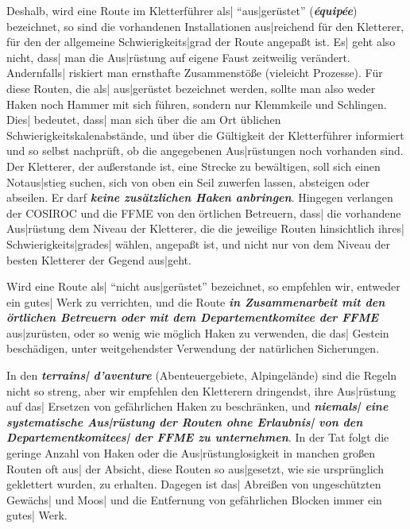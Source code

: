 \documentclass[12pt]{article}
\def\Ital#1{{\bfseries\slshape #1\/}}
\def\3{\ss}
\def\<{``}
\def\>{''}
\def\FFME{{\SetCmDefault\rm FFME{}}}
\def\COSIROC{{\SetCmDefault\rm COSIROC{}}}
\begin{document}
 Deshalb, wird eine Route im Kletterf\"uhrer als| \<aus|ger\"ustet\>
(\Ital{\'equip\'ee}) be\-zeich\-net, so sind die vorhandenen Installationen
aus|reichend f\"ur den Kletterer, f\"ur den der allgemeine Schwierigkeits|grad
der Route angepa\3t ist. Es| geht also nicht, das{}s| man die Aus|r\"ustung
auf eigene Faust zeitweilig ver\"andert. Andernfalls| riskiert man ernsthafte
Zusammenst\"o\3e (vieleicht Prozesse). F\"ur diese Routen, die
als| aus|ger\"ustet be\-zeich\-net werden, sollte man also weder Haken noch
Hammer mit sich f\"uhren, sondern nur Klemmkeile und Schlingen. Dies|
bedeutet, das{}s| man sich \"uber die am Ort \"ublichen
Schwierigkeit\-skalenabst\"ande, und \"uber die G\"ultigkeit der
Kletterf\"uhrer informiert und so selbst nachpr\"uft, ob die angegebenen
Aus|r\"ustungen noch vorhanden sind. Der Kletterer, der au\3erstande ist,
eine Strecke zu bew\"altigen, soll sich einen Notaus|stieg suchen, sich von
oben ein Seil zuwerfen lassen, absteigen oder abseilen. Er darf \Ital{keine
zus\"atzlichen Haken anbringen}. Hingegen verlangen der \COSIROC{} und die \FFME{}
von den \"ortlichen Betreuern, das{}s| die vorhandene Aus|r\"ustung dem Niveau
der Kletterer, die die jeweilige Routen hinsichtlich ihres|
Schwierigkeits|\-grades| w\"ahlen, angepa\3t ist, und nicht nur von dem
Niveau der besten Kletterer der Gegend aus|geht.



 Wird eine Route als| \<nicht aus|ger\"ustet\> be\-zeich\-net, so empfehlen wir,
entweder ein gutes| Werk zu verrichten, und die Route \Ital{in Zusammenarbeit mit
den \"ortlichen Betreuern oder mit dem Departement\-komitee der \FFME}
aus|zur\"usten, oder so wenig wie m\"oglich Haken zu verwenden, die das| Gestein
besch\"adigen, unter weitgehendster Verwendung der nat\"urlichen Sicherungen.

In den \Ital{terrains| d'aventure} (Abenteuergebiete, Alpingel\"ande) sind die
Regeln nicht so streng, aber wir empfehlen den Kletterern dringendst, ihre
Aus|r\"ustung auf das| Ersetzen von gef\"ahrlichen Haken zu beschr\"anken, und
\Ital{niemals| eine systematische Aus|r\"ustung der Routen ohne Erlaubnis| von den
Departement\-komitees| der \FFME{} zu unternehmen}. In der Tat folgt die geringe
Anzahl von Haken oder die Aus|r\"ustung\-losigkeit in manchen gro\3en Routen
oft aus| der Absicht, diese Routen so aus|gesetzt, wie sie urspr\"unglich
geklettert wurden, zu erhalten. Dagegen ist das| Abrei\3en von
ungesch\"utzten Gew\"achs| und Moos| und die Entfernung von gef\"ahrlichen
Blocken immer ein gutes| Werk.
\end{document}
